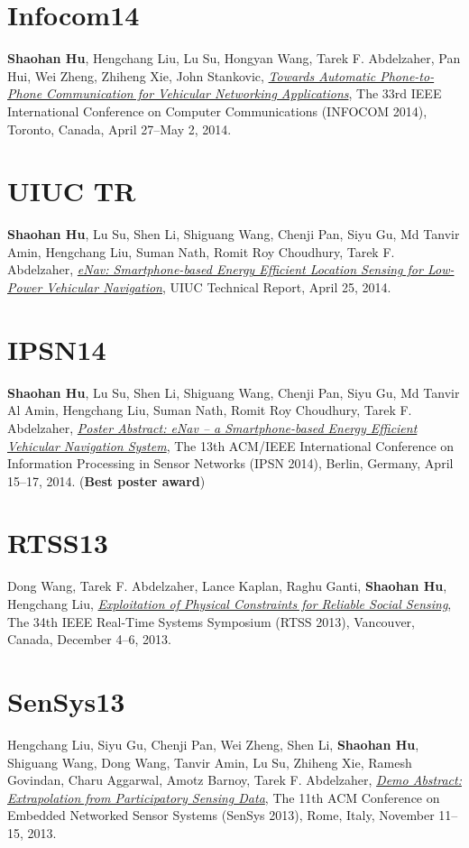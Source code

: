 \section{\sc Infocom14}\hypertarget{hu2014infocom}{}
\textbf{Shaohan Hu}, Hengchang Liu, Lu Su, Hongyan Wang, Tarek F.
Abdelzaher, Pan Hui, Wei Zheng, Zhiheng Xie, John Stankovic,
\href{}{\emph{Towards Automatic Phone-to-Phone Communication for Vehicular
  Networking Applications}}, \textsf{The 33rd IEEE International Conference on Computer Communications (INFOCOM 2014)}, Toronto, Canada, April 27--May 2, 2014.

\section{\sc UIUC TR}\hypertarget{hu2014uiuc1}{}
\textbf{Shaohan Hu}, Lu Su, Shen Li, Shiguang Wang, Chenji Pan, Siyu Gu, Md Tanvir Amin,
Hengchang Liu, Suman Nath, Romit Roy Choudhury, Tarek F. Abdelzaher, \href{https://www.ideals.illinois.edu/handle/2142/48917}{\emph{eNav:
  Smartphone-based Energy Efficient Location Sensing for Low-Power
  Vehicular Navigation}}, \textsf{UIUC Technical Report}, April 25, 2014.

\section{\sc IPSN14}\hypertarget{hu2014ipsn}{}
\textbf{Shaohan Hu}, Lu Su, Shen Li, Shiguang Wang, Chenji Pan, Siyu Gu, Md Tanvir Al Amin, Hengchang Liu, Suman Nath, Romit Roy Choudhury, Tarek F.
Abdelzaher, \href{http://dl.acm.org/citation.cfm?id=2602374}{\emph{Poster Abstract: eNav -- a Smartphone-based Energy Efficient Vehicular Navigation System}}, \textsf{The 13th
  ACM/IEEE International Conference on Information Processing in
  Sensor Networks (IPSN 2014)}, Berlin, Germany, April 15--17, 2014. (\textbf{Best poster award})

\section{\sc RTSS13}\hypertarget{wang2013rtss}{}
Dong Wang, Tarek F. Abdelzaher, Lance Kaplan, Raghu Ganti,
\textbf{Shaohan Hu}, Hengchang Liu, \href{http://ieeexplore.ieee.org/xpl/articleDetails.jsp?tp=&arnumber=6728876}{\emph{Exploitation of Physical
  Constraints for Reliable Social Sensing}}, \textsf{The 34th IEEE
  Real-Time Systems Symposium (RTSS 2013)}, Vancouver, Canada,
December 4--6, 2013.

\section{\sc SenSys13}\hypertarget{liu2013sensys}{}
Hengchang Liu, Siyu Gu, Chenji Pan, Wei Zheng, Shen Li,
\textbf{Shaohan Hu}, Shiguang Wang, Dong Wang, Tanvir Amin, Lu Su,
Zhiheng Xie, Ramesh Govindan, Charu Aggarwal, Amotz Barnoy, Tarek F.
Abdelzaher, \href{http://portal.acm.org/citation.cfm?id=2517431}{\emph{Demo Abstract: Extrapolation from Participatory
  Sensing Data}}, \textsf{The 11th ACM Conference on Embedded Networked
  Sensor Systems (SenSys 2013)}, Rome, Italy, November 11--15, 2013.

